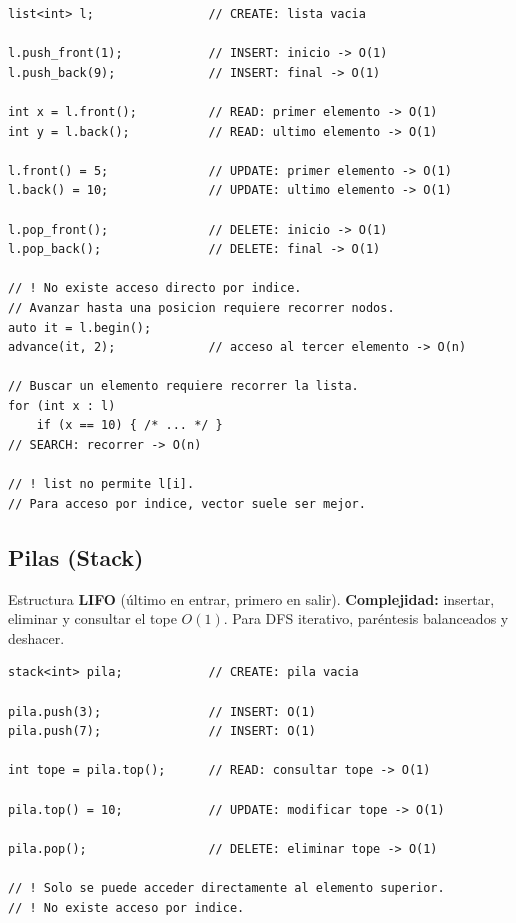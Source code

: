 \documentclass[10pt,a4paper,twocolumn]{article}
\begin{document}
\begin{lstlisting}[style=cpp]
list<int> l;                // CREATE: lista vacia

l.push_front(1);            // INSERT: inicio -> O(1)
l.push_back(9);             // INSERT: final -> O(1)

int x = l.front();          // READ: primer elemento -> O(1)
int y = l.back();           // READ: ultimo elemento -> O(1)

l.front() = 5;              // UPDATE: primer elemento -> O(1)
l.back() = 10;              // UPDATE: ultimo elemento -> O(1)

l.pop_front();              // DELETE: inicio -> O(1)
l.pop_back();               // DELETE: final -> O(1)

// ! No existe acceso directo por indice.
// Avanzar hasta una posicion requiere recorrer nodos.
auto it = l.begin();
advance(it, 2);             // acceso al tercer elemento -> O(n)

// Buscar un elemento requiere recorrer la lista.
for (int x : l)
    if (x == 10) { /* ... */ }
// SEARCH: recorrer -> O(n)

// ! list no permite l[i].
// Para acceso por indice, vector suele ser mejor.
\end{lstlisting}

\subsection{Pilas (Stack)}

Estructura \textbf{LIFO} (último en entrar, primero en salir).
\textbf{Complejidad:} insertar, eliminar y consultar el tope $O(1)$. Para DFS
iterativo, paréntesis balanceados y deshacer.

\begin{lstlisting}[style=cpp]
stack<int> pila;            // CREATE: pila vacia

pila.push(3);               // INSERT: O(1)
pila.push(7);               // INSERT: O(1)

int tope = pila.top();      // READ: consultar tope -> O(1)

pila.top() = 10;            // UPDATE: modificar tope -> O(1)

pila.pop();                 // DELETE: eliminar tope -> O(1)

// ! Solo se puede acceder directamente al elemento superior.
// ! No existe acceso por indice.
\end{lstlisting}
\end{document}
